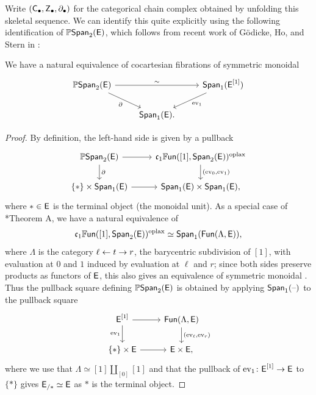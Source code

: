 \documentclass[a4paper,11pt]{article}
\begin{document}
Write $(\textup{\textsf{C}}_{\bullet},\textup{\textsf{Z}}_{\bullet},\partial_{\bullet})$ for the
categorical chain complex obtained by unfolding this skeletal
sequence. We can identify this quite explicitly using the following identification of $\mathbb{P}\textup{\textsf{Span}}_{2}(\textup{\textsf{E}})$, which follows from recent work of G\"odicke, Ho, and Stern in \cite{SpanII}:
\begin{propn}\label{propn:oplax slice spans}
  We have a natural equivalence of cocartesian fibrations of symmetric monoidal \icats{}
  \[
    \begin{tikzcd}
     \mP\Span_{2}(\oE) \ar[rr, "\sim"] \ar[dr, "\partial"'] & & \Span_{1}(\oE^{[1]}) \ar[dl, "\ev_{1}"] \\
      & \Span_{1}(\oE).
    \end{tikzcd}
  \]
\end{propn}
\begin{proof}
  By definition, the left-hand side is given by a pullback
  \[
    \begin{tikzcd}
      \mP\Span_{2}(\oE) \ar[r] \ar[d, "\partial"] & \core \FUN([1], \Span_{2}(\oE))^{\oplax}  \ar[d, "{(\ev_{0}, \ev_{1})}"] \\
      \{*\} \times \Span_{1}(\oE) \ar[r] & \Span_{1}(\oE) \times \Span_{1}(\oE),
    \end{tikzcd}
  \]
  where $* \in \textup{\textsf{E}}$ is the terminal object (the monoidal unit).
  As a special case of \cite{SpanII}*{Theorem A}, we have a natural
  equivalence of \icats{}
  \[ \mathfrak{c}_{1} \mathbb{F}\mkern-0.5mu\textsf{\textup{un}}([1], \textup{\textsf{Span}}_{2}(\textup{\textsf{E}}))^{\text{\textup{oplax}}} \simeq
    \textup{\textsf{Span}}_{1}(\textup{\textsf{Fun}}(\Lambda, \textup{\textsf{E}})),\] where $\Lambda$ is the category
  $\ell \from t \to r$, \ie{} the barycentric subdivision of $[1]$,
  with evaluation at $0$ and $1$ induced by evaluation at $\ell$ and
  $r$; since both sides preserve products as functors of $\textup{\textsf{E}}$, this
  also gives an equivalence of symmetric monoidal \icats{}. Thus the
  pullback square defining $\mathbb{P}\textup{\textsf{Span}}_{2}(\textup{\textsf{E}})$ is obtained by applying
  $\textup{\textsf{Span}}_{1}(\text{\textendash})$ to the pullback square
  \[
    \begin{tikzcd}
     \oE^{[1]} \ar[r] \ar[d, "\ev_{1}"'] & \Fun(\Lambda, \oE)  \ar[d, "{(\ev_{\ell},\ev_{r})}"] \\
     \{*\} \times \oE \ar[r] & \oE \times \oE,
    \end{tikzcd}
  \]
  where we use that $\Lambda \simeq [1] \amalg_{[0]} [1]$ and that the pullback of $\ev_{1} \colon \oE^{[1]} \to \oE$ to $\{*\}$ gives $\textup{\textsf{E}}_{/*} \simeq \textup{\textsf{E}}$ as $*$ is the terminal object.
\end{proof}
\end{document}
